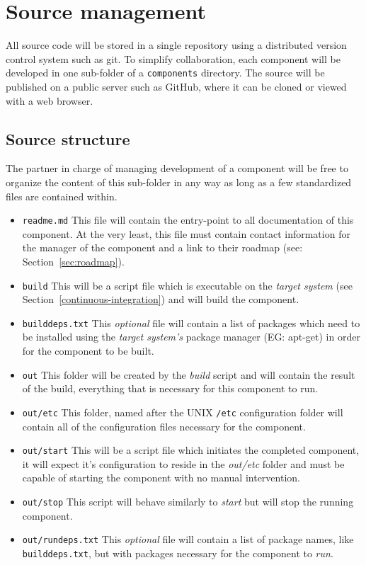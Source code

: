 \section{Source management}
\label{sec:source-management}

All source code will be stored in a single repository using a distributed version control
system such as git. To simplify collaboration, each component will be developed in one
sub-folder of a \texttt{components} directory. The source will be published on a public
server such as GitHub, where it can be cloned or viewed with a web browser.

\subsection{Source structure}
\label{sec:source-structure}
The partner in charge of managing development of a component will be free to organize the content
of this sub-folder in any way as long as a few standardized files are contained within.

\begin{itemize}
\item \texttt{readme.md} This file will contain the entry-point to all documentation of this
component. At the very least, this file must contain contact information for the manager of
the component and a link to their roadmap (see: Section~\ref{sec:roadmap}).
\item \texttt{build} This will be a script file which is executable on the \emph{target system}
(see Section~\ref{continuous-integration}) and will build the component.
\item \texttt{builddeps.txt} This \emph{optional} file will contain a list of packages which
need to be installed using the \emph{target system's} package manager (EG: apt-get) in order for
the component to be built.
\item \texttt{out} This folder will be created by the \emph{build} script and will contain the
result of the build, everything that is necessary for this component to run.
\item \texttt{out/etc} This folder, named after the UNIX \texttt{/etc} configuration folder will
contain all of the configuration files necessary for the component.
\item \texttt{out/start} This will be a script file which initiates the completed component, it will
expect it's configuration to reside in the \emph{out/etc} folder and must be capable of starting
the component with no manual intervention.
\item \texttt{out/stop} This script will behave similarly to \emph{start} but will stop the running
component.
\item \texttt{out/rundeps.txt} This \emph{optional} file will contain a list of package names,
like \texttt{builddeps.txt}, but with packages necessary for the component to \emph{run}.
\end{itemize}

